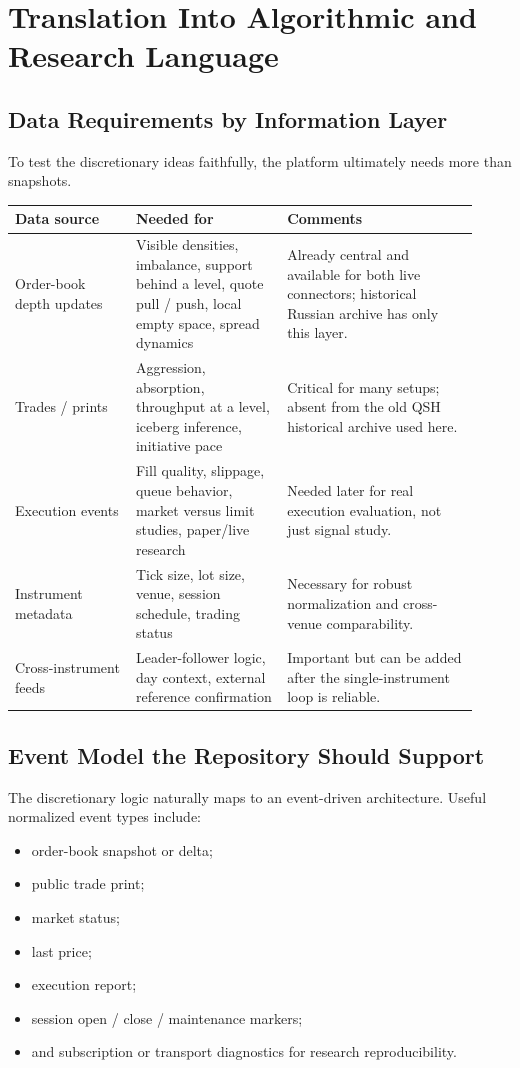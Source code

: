 \section{Translation Into Algorithmic and Research Language}

\subsection{Data Requirements by Information Layer}

To test the discretionary ideas faithfully, the platform ultimately needs more than snapshots.

\begin{longtable}{p{0.24\linewidth}p{0.30\linewidth}p{0.38\linewidth}}
\toprule
\textbf{Data source} & \textbf{Needed for} & \textbf{Comments} \\
\midrule
Order-book depth updates & Visible densities, imbalance, support behind a level, quote pull / push, local empty space, spread dynamics & Already central and available for both live connectors; historical Russian archive has only this layer. \\
Trades / prints & Aggression, absorption, throughput at a level, iceberg inference, initiative pace & Critical for many setups; absent from the old QSH historical archive used here. \\
Execution events & Fill quality, slippage, queue behavior, market versus limit studies, paper/live research & Needed later for real execution evaluation, not just signal study. \\
Instrument metadata & Tick size, lot size, venue, session schedule, trading status & Necessary for robust normalization and cross-venue comparability. \\
Cross-instrument feeds & Leader-follower logic, day context, external reference confirmation & Important but can be added after the single-instrument loop is reliable. \\
\bottomrule
\end{longtable}

\subsection{Event Model the Repository Should Support}

The discretionary logic naturally maps to an event-driven architecture.
Useful normalized event types include:
\begin{itemize}
  \item order-book snapshot or delta;
  \item public trade print;
  \item market status;
  \item last price;
  \item execution report;
  \item session open / close / maintenance markers;
  \item and subscription or transport diagnostics for research reproducibility.
\end{itemize}

